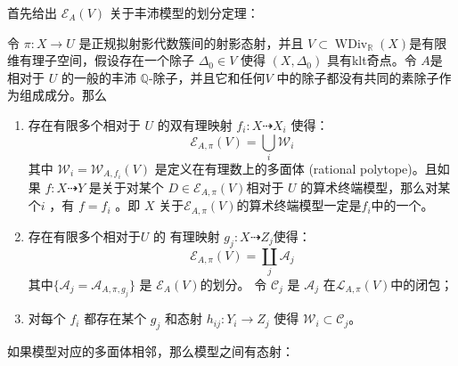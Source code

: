 首先给出 $\mathcal{E}_{A}(V)$ 关于丰沛模型的划分定理：
\begin{theorem}\label{finitemodel}
  \cite[Corollary 1.1.5]{BCHM10} 令 $\pi:X\to U$ 是正规拟射影代数簇间的射影态射，并且 $V \subset \operatorname{WDiv}_{\mathbb{R}}(X)$是有限维有理子空间，假设存在一个除子 $\Delta_{0} \in V$ 使得 $(X,\Delta_{0})$ 具有klt奇点。令 $A$是 相对于 $U$ 的一般的丰沛 $\mathbb{Q}$-除子，并且它和任何$V$ 中的除子都没有共同的素除子作为组成成分。那么
  \begin{enumerate}
    \item   存在有限多个相对于 $U$ 的双有理映射  $f_{i}:X \dashrightarrow   X_{i}$ 使得：
          \[ \mathcal{E}_{A,\pi}(V) =\bigcup_{i}\mathcal{W}_{i} \]
          其中  $\mathcal{W}_{i}=\mathcal{W}_{A,f_{i}}(V)$ 是定义在有理数上的多面体  (rational polytope)。且如果  $f:X \dashrightarrow  Y$ 是关于对某个 $D \in \mathcal{E}_{A,\pi}(V)$相对于 $U$ 的算术终端模型，那么对某个$i$ ，有  $f=f_{i}$ 。即 $X$ 关于$\mathcal{E}_{A,\pi}(V)$的算术终端模型一定是$f_{i}$中的一个。   
    \item   存在有限多个相对于$U$ 的 有理映射 $g_{j}:X \dashrightarrow  Z_{j}$使得： 
          \[ \mathcal{E}_{A,\pi}(V) =\coprod_{j}\mathcal{A}_{j} \]
          其中$ \{\mathcal{A}_j=\mathcal{A}_{A,\pi,g_j}\} $ 是 $ \mathcal{E}_{A}(V) $的划分。 令 $\mathcal{C}_{j}$ 是 $\mathcal{A}_{j}$ 在$\mathcal{L}_{A,\pi}(V)$中的闭包；
    \item  对每个  $f_{i}$ 都存在某个 $g_{j}$ 和态射 $h_{ij}:Y_{i}\to Z_{j}$ 使得 $\mathcal{W}_{i} \subset \mathcal{C}_{j}$。
  \end{enumerate}
\end{theorem}
如果模型对应的多面体相邻，那么模型之间有态射：
